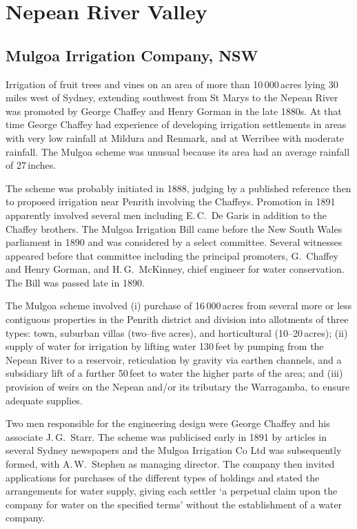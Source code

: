\section*{Nepean River Valley}

\subsection*{Mulgoa Irrigation Company, NSW}

Irrigation of fruit trees and vines on an area of more than
10\,000\,acres lying 30 miles west of Sydney, extending southwest from
St Marys to the Nepean River was promoted by George Chaffey
 and Henry
Gorman  in the late 1880s.  At that time George
Chaffey had experience of developing irrigation settlements in areas
with very low rainfall at Mildura and Renmark, and at Werribee with
moderate rainfall.  The Mulgoa scheme was unusual because its area had
an average rainfall of 27\,inches.

The scheme was probably initiated in 1888, judging by a published
reference then to proposed irrigation near Penrith involving the
Chaffeys.  Promotion in 1891 apparently involved several men including
E.\,C.~De Garis in addition to the Chaffey brothers.  The Mulgoa
Irrigation Bill came before the New South Wales parliament in 1890 and
was considered by a select committee.  Several witnesses appeared
before that committee including the principal promoters, G.~Chaffey
and Henry Gorman, and H.\,G.~McKinney,  chief
engineer for water conservation.  The Bill was passed late in
1890.

The Mulgoa scheme involved (i) purchase of 16\,000\,acres from several
more or less contiguous properties in the Penrith district and
division into allotments of three types: town, suburban villas
(two--five acres), and horticultural (10--20\,acres); (ii) supply of
water for irrigation by lifting water 130\,feet by pumping from the
Nepean River to a reservoir, reticulation by gravity via earthen
channels, and a subsidiary lift of a further 50\,feet to water the
higher parts of the area; and (iii) provision of weirs on the Nepean
and/or its tributary the Warragamba,  to
ensure adequate supplies.

Two men responsible for the engineering design were George Chaffey and
his associate J.\,G.~Starr.  The scheme was
publicised early in 1891 by articles in several Sydney newspapers and
the Mulgoa Irrigation Co Ltd was subsequently formed, with
A.\,W.~Stephen  as managing director.  The
company then invited applications for purchases of the different types
of holdings and stated the arrangements for water supply, giving each
settler `a perpetual claim upon the company for water on the specified
terms' without the establishment of a water company.


